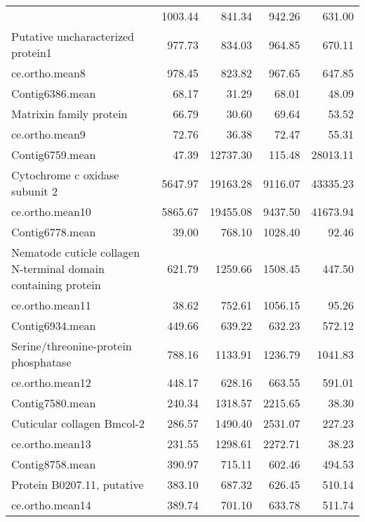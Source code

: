 \begin{table}[ht]
\begin{center}
\begin{tabular}{p{5cm}rrrr}
\begin{table}[ht]
\begin{center}
\begin{tabular}{p{5cm}rrrr}
  
Contig6043.mean & 1003.44 & 841.34 & 942.26 & 631.00 \\ 
  Putative uncharacterized protein1 & 977.73 & 834.03 & 964.85 & 670.11 \\ 
  ce.ortho.mean8 & 978.45 & 823.82 & 967.65 & 647.85 \\ 
   \hline
Contig6386.mean & 68.17 & 31.29 & 68.01 & 48.09 \\ 
  Matrixin family protein & 66.79 & 30.60 & 69.64 & 53.52 \\ 
  ce.ortho.mean9 & 72.76 & 36.38 & 72.47 & 55.31 \\ 
   \hline
Contig6759.mean & 47.39 & 12737.30 & 115.48 & 28013.11 \\ 
  Cytochrome c oxidase subunit 2 & 5647.97 & 19163.28 & 9116.07 & 43335.23 \\ 
  ce.ortho.mean10 & 5865.67 & 19455.08 & 9437.50 & 41673.94 \\ 
   \hline
Contig6778.mean & 39.00 & 768.10 & 1028.40 & 92.46 \\ 
  Nematode cuticle collagen N-terminal domain containing protein & 621.79 & 1259.66 & 1508.45 & 447.50 \\ 
  ce.ortho.mean11 & 38.62 & 752.61 & 1056.15 & 95.26 \\ 
   \hline
Contig6934.mean & 449.66 & 639.22 & 632.23 & 572.12 \\ 
  Serine/threonine-protein phosphatase & 788.16 & 1133.91 & 1236.79 & 1041.83 \\ 
  ce.ortho.mean12 & 448.17 & 628.16 & 663.55 & 591.01 \\ 
   \hline
Contig7580.mean & 240.34 & 1318.57 & 2215.65 & 38.30 \\ 
  Cuticular collagen Bmcol-2 & 286.57 & 1490.40 & 2531.07 & 227.23 \\ 
  ce.ortho.mean13 & 231.55 & 1298.61 & 2272.71 & 38.23 \\ 
   \hline
Contig8758.mean & 390.97 & 715.11 & 602.46 & 494.53 \\ 
  Protein B0207.11, putative & 383.10 & 687.32 & 626.45 & 510.14 \\ 
  ce.ortho.mean14 & 389.74 & 701.10 & 633.78 & 511.74 \\ 
   \hline
\end{tabular}
\end{center}
\end{table}





